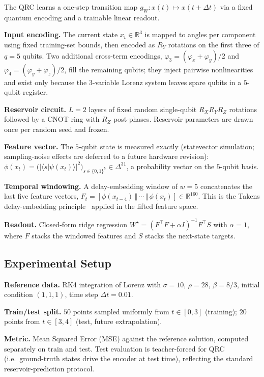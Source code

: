 \documentclass[11pt,a4paper]{article}
\newcommand{\R}{\mathbb{R}}
\begin{document}
The QRC learns a one-step transition map
$g_W : x(t) \mapsto x(t + \Delta t)$ via a fixed quantum encoding and
a trainable linear readout.

\textbf{Input encoding.} The current state $x_t \in \R^3$ is mapped
to angles per component using fixed training-set bounds, then encoded
as $R_Y$ rotations on the first three of $q = 5$ qubits. Two
additional cross-term encodings,
$\varphi_3 = (\varphi_x + \varphi_y)/2$ and
$\varphi_4 = (\varphi_y + \varphi_z)/2$, fill the remaining qubits;
they inject pairwise nonlinearities and exist only because the
$3$-variable Lorenz system leaves spare qubits in a $5$-qubit register.

\textbf{Reservoir circuit.} $L = 2$ layers of fixed random
single-qubit $R_X R_Y R_Z$ rotations followed by a CNOT ring with
$R_Z$ post-phases. Reservoir parameters are drawn once per random
seed and frozen.

\textbf{Feature vector.} The $5$-qubit state is measured exactly
(statevector simulation; sampling-noise effects are deferred to a
future hardware revision):
$\phi(x_t) = \bigl( |\langle s | \psi(x_t)\rangle|^2 \bigr)_{s \in \{0,1\}^5} \in \Delta^{31}$,
a probability vector on the $5$-qubit basis.

\textbf{Temporal windowing.} A delay-embedding window of $w = 5$
concatenates the last five feature vectors,
$F_t = [\phi(x_{t-4}) \,\Vert\, \cdots \,\Vert\, \phi(x_t)] \in \R^{160}$.
This is the Takens delay-embedding principle~\cite{takens1981}
applied in the lifted feature space.

\textbf{Readout.} Closed-form ridge regression
$W^\star = (F^\top F + \alpha I)^{-1} F^\top S$ with
$\alpha = 1$, where $F$ stacks the windowed features and $S$ stacks
the next-state targets.

\subsection{Experimental Setup}

\textbf{Reference data.} RK4 integration of Lorenz with $\sigma = 10$,
$\rho = 28$, $\beta = 8/3$, initial condition $(1, 1, 1)$, time step
$\Delta t = 0.01$.

\textbf{Train/test split.} $50$ points sampled uniformly from
$t \in [0, 3]$ (training); $20$ points from $t \in [3, 4]$ (test, future
extrapolation).

\textbf{Metric.} Mean Squared Error (MSE) against the reference
solution, computed separately on train and test. Test evaluation is
teacher-forced for QRC (i.e.\ ground-truth states drive the encoder
at test time), reflecting the standard reservoir-prediction protocol.
\end{document}
